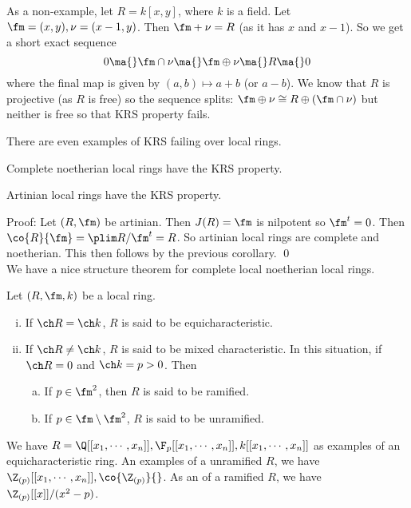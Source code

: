 \begin{ex}
As a non-example, let $R=k[x,y]$, where $k$ is a field. Let $\fm=(x,y), \nu=(x-1,y)$. Then $\fm+\nu=R$ (as it has $x$ and $x-1$). So we get a short exact sequence
\[
0 \ma{} \fm \cap \nu \ma{} \fm \oplus \nu \ma{} R \ma{} 0
\]
where the final map is given by $(a,b) \mapsto a+b$ (or $a-b$). We know that $R$ is projective (as $R$ is free) so the sequence splits: $\fm \oplus \nu \cong R \oplus (\fm \cap \nu)$ but neither is free so that KRS property fails. 
\end{ex}

\begin{rem}
There are even examples of KRS failing over local rings. 
\end{rem}

\begin{cor}
Complete noetherian local rings have the KRS property. 
\end{cor}

\begin{cor}
Artinian local rings have the KRS property.
\end{cor}

\noindent Proof: Let $(R,\fm)$ be artinian. Then $J(R)=\fm$ is nilpotent so $\fm^t=0$. Then $\co{R}{\fm}=\plim R/\fm^t=R$. So artinian local rings are complete and noetherian. This then follows by the previous corollary. \qed \\

We have a nice structure theorem for complete local noetherian local rings.

\begin{dfn}
Let $(R,\fm,k)$ be a local ring.
\begin{enumerate}[(i)]
\item If $\ch R=\ch k$, $R$ is said to be equicharacteristic.
\item If $\ch R \neq \ch k$, $R$ is said to be mixed characteristic. In this situation, if $\ch R=0$ and $\ch k=p>0$. Then
\begin{enumerate}[(a)]
\item If $p \in \fm^2$, then $R$ is said to be ramified. 
\item If $p \in \fm \setminus \fm^2$, $R$ is said to be unramified. 
\end{enumerate}
\end{enumerate}
\end{dfn}

\begin{ex}
We have $R=\Q[[x_1,\cdots,x_n]], \F_p[[x_1,\cdots,x_n]], k[[x_1,\cdots,x_n]]$ as examples of an equicharacteristic ring. An examples of a unramified $R$, we have $\Z_{(p)}[[x_1,\cdots,x_n]], \co{\Z_{(p)}}{}$. As an of a ramified $R$, we have $\Z_{(p)}[[x]]/(x^2-p)$.
\end{ex}

